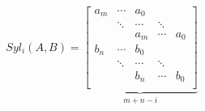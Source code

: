 \begin{align*}
Syl_i(A,B)=
\underbrace{
\begin{bmatrix}
a_m & \cdots & a_0 & & \\
&\ddots & \cdots & \ddots & \\
& & a_m & \cdots & a_0 \\
b_n & \cdots & b_0 & & \\
&\ddots & \cdots & \ddots & \\
& &b_n & \cdots &b_0 \\
\end{bmatrix}
}_{m+n-i}
\end{align*}